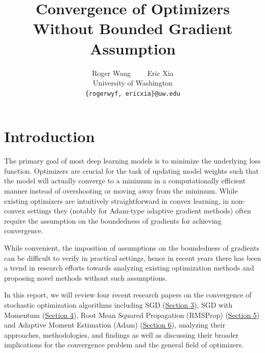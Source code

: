 \documentclass{article}
\title{Convergence of Optimizers Without Bounded Gradient Assumption}
\author{%
  Roger Wang \ \ \ \  Eric Xia \\
  University of Washington\\
  \texttt{\{rogerwyf, ericxia\}@uw.edu} 
}
\begin{document}
\maketitle


\section{Introduction}

The primary goal of most deep learning models is to minimize the underlying loss function.
Optimizers are crucial for the task of updating model weights such that the model will actually converge to a minimum in a computationally efficient manner instead of overshooting or moving away from the minimum. While existing optimizers are intuitively straightforward in convex learning, in non-convex settings they (notably for Adam-type adaptive gradient methods)
often require the assumption on the boundedness of gradients for achieving convergence.

While convenient, the imposition of assumptions on the boundedness of gradients can be difficult to verify in practical settings, hence in recent years there has been a trend in research efforts towards analyzing existing optimization methods and proposing novel methods without such assumptions. 

In this report, we will review four recent research papers on the convergence of stochastic optimization algorithms including SGD (\hyperref[section3]{Section 3}), SGD with Momentum (\hyperref[section4]{Section 4}), Root Mean Squared Propagation (RMSProp) (\hyperref[section6]{Section 5}) and Adaptive Moment Estimation (Adam) (\hyperref[section7]{Section 6}), analyzing their approaches, methodologies, and findings as well as discussing their broader implications for the convergence problem and the general field of optimizers.
\end{document}
